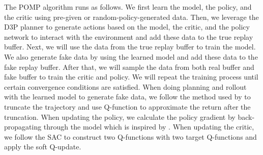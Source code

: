 \documentclass{article} %
\begin{document}
The  POMP algorithm runs as follows. We first learn the model, the policy, and the critic using pre-given or random-policy-generated data. Then, we leverage the D3P planner to generate actions based on the model, the critic, and the policy network to interact with the environment and add these data to the true replay buffer. Next, we will use the data from the true replay buffer to train the model. We also generate fake data  by using the learned model and add these data to the fake replay buffer.  After that, we will sample the data from both real  buffer and fake buffer to train the critic and policy. We will repeat the training process until certain convergence conditions are satisfied. 
When doing planning and rollout with the learned model to generate fake data, we follow the method used by \cite{janner2019trust,clavera_model-augmented_2019} to truncate the trajectory and use Q-function to approximate the return after the truncation.   When updating the policy, we calculate the policy gradient by back-propagating through the model which  is inspired by \cite{clavera_model-augmented_2019}. When updating the critic, we follow the SAC \citep{haarnoja2018soft} to construct two Q-functions with two target Q-functions and apply the soft Q-update. 


\end{document}
